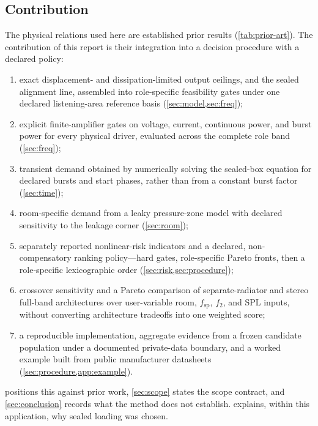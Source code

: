 \subsection{Contribution}
\label{sec:intro-contribution}

The physical relations used here are established prior results
(\cref{tab:prior-art}). The contribution of this report is their
integration into a decision procedure with a declared policy:

\begin{enumerate}
\item exact displacement- and dissipation-limited output ceilings, and the
	sealed alignment line, assembled into role-specific feasibility gates
	under one declared listening-area reference basis
	(\cref{sec:model,sec:freq});
\item explicit finite-amplifier gates on voltage, current, continuous power,
	and burst power for every physical driver, evaluated across the complete
	role band (\cref{sec:freq});
\item transient demand obtained by numerically solving the sealed-box
	equation for declared bursts and start phases, rather than from a
	constant burst factor (\cref{sec:time});
\item room-specific demand from a leaky pressure-zone model with declared
	sensitivity to the leakage corner (\cref{sec:room});
\item separately reported nonlinear-risk indicators and a declared,
	non-compensatory ranking policy---hard gates, role-specific Pareto
	fronts, then a role-specific lexicographic order
	(\cref{sec:risk,sec:procedure});
\item crossover sensitivity and a Pareto comparison of separate-radiator
	and stereo full-band architectures over user-variable room,
	$f_{\mathrm{sp}}$, $f_2$, and SPL inputs, without converting architecture tradeoffs
	into one weighted score;
\item a reproducible implementation, aggregate evidence from a frozen
	candidate population under a documented private-data boundary, and a
	worked example built from public manufacturer datasheets
	(\cref{sec:procedure,app:example}).
\end{enumerate}

 positions this against prior work, \cref{sec:scope}
states the scope contract, and \cref{sec:conclusion} records what the
method does not establish.  explains, within this
application, why sealed loading was chosen.
